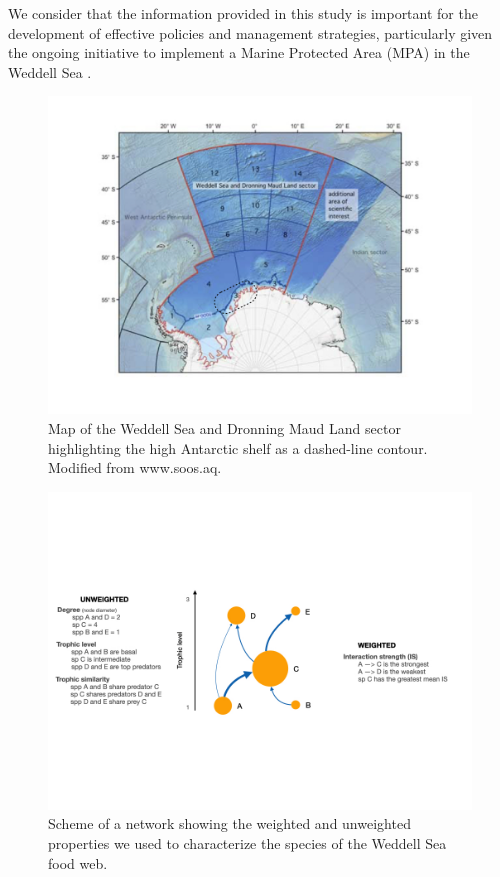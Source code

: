 \documentclass[gc, manuscript]{copernicus}
\begin{document}
We consider that the information provided in this study is important for
the development of effective policies and management strategies,
particularly given the ongoing initiative to implement a Marine
Protected Area (MPA) in the Weddell Sea \citep{Teschke2021}.

\clearpage

\begin{figure}
\includegraphics[width=12cm]{Fig.1_StudyMap} \caption{Map of the Weddell Sea and Dronning Maud Land sector highlighting the high Antarctic shelf as a dashed-line contour. Modified from www.soos.aq.}\label{fig:unnamed-chunk-1}
\end{figure}

\clearpage

\begin{figure}
\includegraphics[width=12cm]{Fig.2_ToyFoodWeb} \caption{Scheme of a network showing the weighted and unweighted properties we used to characterize the species of the Weddell Sea food web.}\label{fig:unnamed-chunk-2}
\end{figure}
\end{document}
